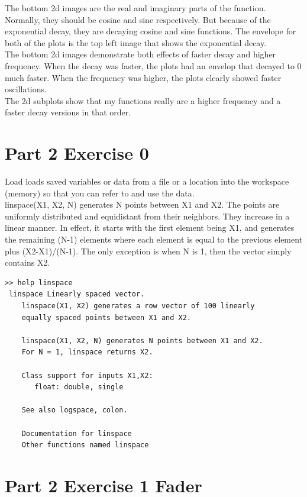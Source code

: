 \documentclass[11pt]{article}
\begin{document}
The bottom 2d images are the real and imaginary parts of the function. Normally, they should be cosine and sine respectively. But because of the exponential decay, they are decaying cosine and sine functions. The envelope for both of the plots is the top left image that shows the exponential decay.\\

The bottom 2d images demonstrate both effects of faster decay and higher frequency. When the decay was faster, the plots had an envelop that decayed to 0 much faster. When the frequency was higher, the plots clearly showed faster oscillations.\\

The 2d subplots show that my functions really are a higher frequency and a faster decay versions in that order.

\pagebreak 
\section{Part 2 Exercise 0}

Load loads saved variables or data from a file or a location into the workspace (memory) so that you can refer to and use the data.\\

linspace(X1, X2, N) generates N points between X1 and X2. The points are uniformly distributed and equidistant from their neighbors. They increase in a linear manner. In effect, it starts with the first element being X1, and generates the remaining (N-1) elements where each element is equal to the previous element plus (X2-X1)/(N-1). The only exception is when N is 1, then the vector simply contains X2.

\begin{lstlisting}
>> help linspace
 linspace Linearly spaced vector.
    linspace(X1, X2) generates a row vector of 100 linearly
    equally spaced points between X1 and X2.
 
    linspace(X1, X2, N) generates N points between X1 and X2.
    For N = 1, linspace returns X2.
 
    Class support for inputs X1,X2:
       float: double, single
 
    See also logspace, colon.

    Documentation for linspace
    Other functions named linspace
\end{lstlisting}

\pagebreak 
\section{Part 2 Exercise 1 Fader}
\end{document}

